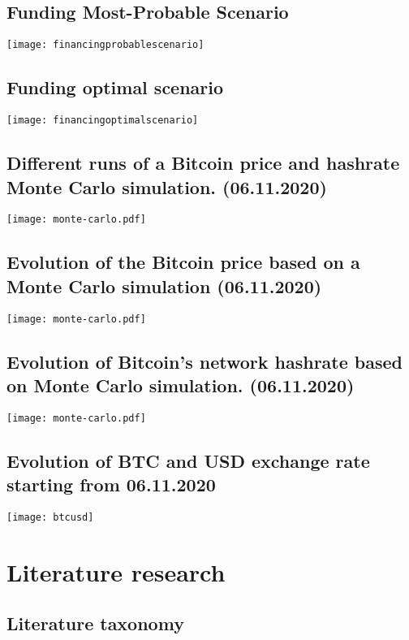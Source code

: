 \newpage
\subsection{Funding Most-Probable Scenario} \label{toc:finanzierungmostprobable}
\texttt{[image: financingprobablescenario]}

\newpage
\subsection{Funding optimal scenario} \label{toc:finanzierungoptimal}
\texttt{[image: financingoptimalscenario]}

\newpage
\subsection{Different runs of a Bitcoin price and hashrate Monte Carlo simulation. (06.11.2020)} \label{toc:montecarlosimulationvier}
\texttt{[image: monte-carlo.pdf]}

\newpage
\subsection{Evolution of the Bitcoin price based on a Monte Carlo simulation (06.11.2020)} \label{toc:entwicklungbitcoinpreismc}
\texttt{[image: monte-carlo.pdf]}

\newpage
\subsection{Evolution of Bitcoin's network hashrate based on Monte Carlo simulation. (06.11.2020)} \label{toc:entwicklunghashratemc}
\texttt{[image: monte-carlo.pdf]}

\newpage
\subsection{Evolution of \ac{BTC} and \ac{USD} exchange rate starting from 06.11.2020}
\texttt{[image: btcusd]}
\cite[Source:][]{tradingview2021btcusd}

\newpage
\section{Literature research} \label{toc:literaturrecherche}
\subsection{Literature taxonomy} \label{toc:literaturtaxonomie}

